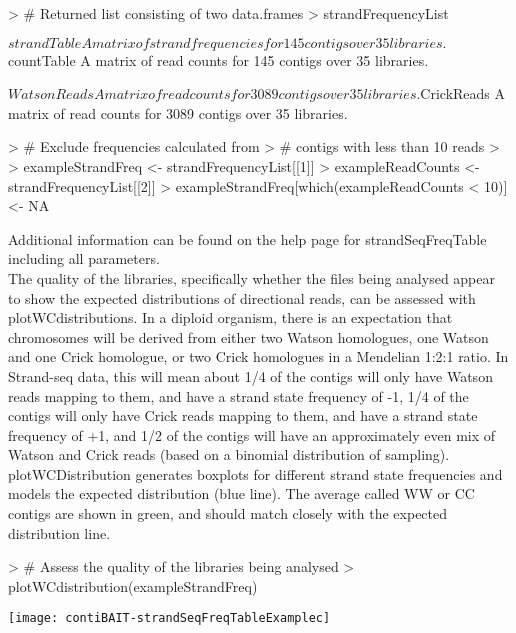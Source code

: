 \documentclass{article}
\begin{document}
\begin{Schunk}
\begin{Sinput}
> # Returned list consisting of two data.frames
> strandFrequencyList
\end{Sinput}
\begin{Soutput}
$strandTable
A matrix of strand frequencies for 145 contigs over 35 libraries.

$countTable
A matrix of read counts for 145 contigs over 35 libraries.

$WatsonReads
A matrix of read counts for 3089 contigs over 35 libraries.

$CrickReads
A matrix of read counts for 3089 contigs over 35 libraries.
\end{Soutput}
\begin{Sinput}
> # Exclude frequencies calculated from
> # contigs with less than 10 reads
> 
> exampleStrandFreq <- strandFrequencyList[[1]]
> exampleReadCounts <- strandFrequencyList[[2]]
> exampleStrandFreq[which(exampleReadCounts < 10)] <- NA 
\end{Sinput}
\end{Schunk}

Additional information can be found on the help page for strandSeqFreqTable including all parameters.\\

The quality of the libraries, specifically whether the files being analysed appear to show the expected distributions of directional reads, can be assessed with plotWCdistributions.  In a diploid organism, there is an expectation that chromosomes will be derived from either two Watson homologues, one Watson and one Crick homologue, or two Crick homologues in a Mendelian 1:2:1 ratio.  In Strand-seq data, this will mean about 1/4 of the contigs will only have Watson reads mapping to them, and have a strand state frequency of -1, 1/4 of the contigs will only have Crick reads mapping to them, and have a strand state frequency of +1, and 1/2 of the contigs will have an approximately even mix of Watson and Crick reads (based on a binomial distribution of sampling).  plotWCDistribution generates boxplots for different strand state frequencies and models the expected distribution (blue line). The average called WW or CC contigs are shown in green, and should match closely with the expected distribution line.

\begin{Schunk}
\begin{Sinput}
> # Assess the quality of the libraries being analysed
> plotWCdistribution(exampleStrandFreq)
\end{Sinput}
\end{Schunk}
\texttt{[image: contiBAIT-strandSeqFreqTableExamplec]}
\end{document}
